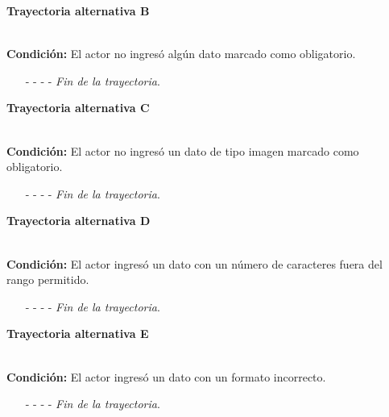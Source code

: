 \hypertarget{CU11-1:TAB}{\textbf{Trayectoria alternativa B}}\\
\noindent \textbf{Condición:} El actor no ingresó algún dato marcado como obligatorio.
\begin{enumerate}
	\UCpaso[\UCsist] Muestra el mensaje  señalando el campo que presenta el error en la pantalla .
	\UCpaso Regresa al paso \ref{CU11.1-P3} de la trayectoria principal.
	\item[- -] - - {\em {Fin de la trayectoria}}.%
\end{enumerate}
\hypertarget{CU11-1:TAC}{\textbf{Trayectoria alternativa C}}\\
\noindent \textbf{Condición:} El actor no ingresó un dato de tipo imagen marcado como obligatorio.
\begin{enumerate}
	\UCpaso[\UCsist] Muestra el mensaje  señalando el campo que presenta el error en la pantalla .
	\UCpaso Regresa al paso \ref{CU11.1-P3} de la trayectoria principal.
	\item[- -] - - {\em {Fin de la trayectoria}}.%
\end{enumerate}
\hypertarget{CU11-1:TAD}{\textbf{Trayectoria alternativa D}}\\
\noindent \textbf{Condición:} El actor ingresó un dato con un número de caracteres fuera del rango permitido.
\begin{enumerate}
	\UCpaso[\UCsist] Muestra el mensaje  señalando el campo que presenta el error en la pantalla .
	\UCpaso Regresa al paso \ref{CU11.1-P3} de la trayectoria principal.
	\item[- -] - - {\em {Fin de la trayectoria}}.%
\end{enumerate}
\hypertarget{CU11-1:TAE}{\textbf{Trayectoria alternativa E}}\\
\noindent \textbf{Condición:} El actor ingresó un dato con un formato incorrecto.
\begin{enumerate}
	\UCpaso[\UCsist] Muestra el mensaje  señalando el campo que presenta el error en la pantalla .
	\UCpaso Regresa al paso \ref{CU11.1-P3} de la trayectoria principal.
	\item[- -] - - {\em {Fin de la trayectoria}}.
\end{enumerate}
